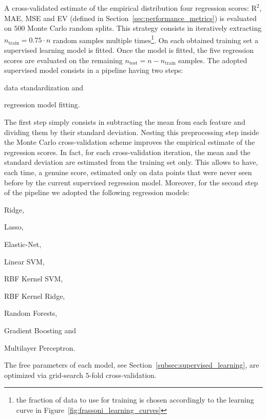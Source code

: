 A cross-validated estimate of the empirical distribution four regression scores: $\text{R}^2$, MAE, MSE and EV (defined in Section~\ref{sec:performance_metrics}) is evaluated on $500$ Monte Carlo random splits.
This strategy consists in iteratively extracting $n_{\text{train}} = 0.75 \cdot n$ random samples multiple times\footnote{the fraction of data to use for training is chosen accordingly to the learning curve in Figure~\ref{fig:frassoni_learning_curves}}. On each obtained training set a supervised learning model is fitted.
Once the model is fitted, the five regression scores are evaluated on the remaining $n_{\text{test}} = n - n_{\text{train}}$ samples.
The adopted supervised model consists in a pipeline having two steps:
\begin{enumerate*}[label=(\roman*)]
	\item data standardization and
	\item regression model fitting.
\end{enumerate*}
The first step simply consists in subtracting the mean from each feature and dividing them by their standard deviation. Nesting this preprocessing step inside the Monte Carlo cross-validation scheme improves the empirical estimate of the regression scores. In fact, for each cross-validation iteration, the mean and the standard deviation are estimated from the training set only. This allows to have, each time, a genuine score, estimated only on data points that were never seen before by the current supervised regression model.
Moreover, for the second step of the pipeline we adopted the following regression models:
\begin{enumerate*}[label=(\alph*)]
	\item Ridge,
	\item Lasso,
	\item Elastic-Net,
	\item Linear SVM,
	\item RBF Kernel SVM,
	\item RBF Kernel Ridge,
	\item Random Forests,
	\item Gradient Boosting and
	\item Multilayer Perceptron.
\end{enumerate*}
The free parameters of each model, see Section~\ref{subsec:supervised_learning}, are optimized via grid-search $5$-fold cross-validation.


